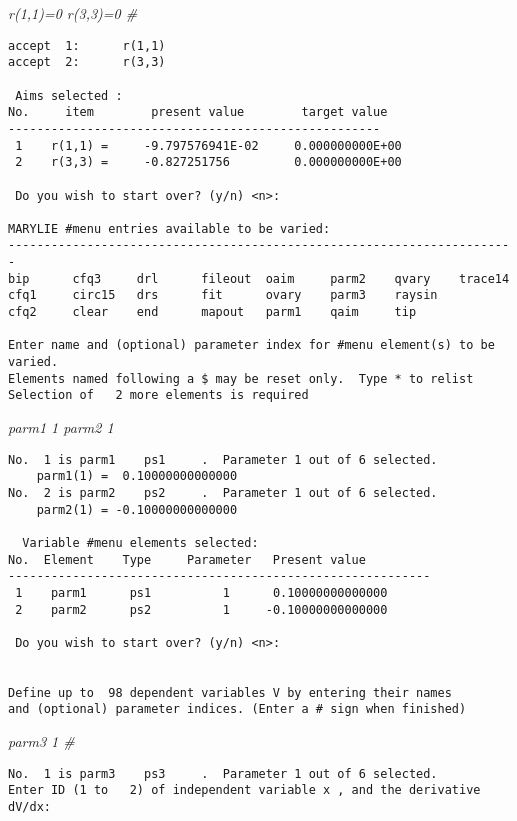 {\em r(1,1)=0 r(3,3)=0 \#}

\begin{footnotesize}
\begin{verbatim}
accept  1:      r(1,1)
accept  2:      r(3,3)

 Aims selected :
No.     item        present value        target value
----------------------------------------------------
 1    r(1,1) =     -9.797576941E-02     0.000000000E+00
 2    r(3,3) =     -0.827251756         0.000000000E+00

 Do you wish to start over? (y/n) <n>:

MARYLIE #menu entries available to be varied:
-----------------------------------------------------------------------
bip      cfq3     drl      fileout  oaim     parm2    qvary    trace14
cfq1     circ15   drs      fit      ovary    parm3    raysin
cfq2     clear    end      mapout   parm1    qaim     tip

Enter name and (optional) parameter index for #menu element(s) to be varied.
Elements named following a $ may be reset only.  Type * to relist
Selection of   2 more elements is required
\end{verbatim}
\end{footnotesize}

{\em parm1 1 parm2 1}

\begin{footnotesize}
\begin{verbatim}
No.  1 is parm1    ps1     .  Parameter 1 out of 6 selected.
    parm1(1) =  0.10000000000000
No.  2 is parm2    ps2     .  Parameter 1 out of 6 selected.
    parm2(1) = -0.10000000000000

  Variable #menu elements selected:
No.  Element    Type     Parameter   Present value
-----------------------------------------------------------
 1    parm1      ps1          1      0.10000000000000
 2    parm2      ps2          1     -0.10000000000000

 Do you wish to start over? (y/n) <n>:


Define up to  98 dependent variables V by entering their names
and (optional) parameter indices. (Enter a # sign when finished)
\end{verbatim}
\end{footnotesize}

{\em parm3 1 \#}

\begin{footnotesize}
\begin{verbatim}
No.  1 is parm3    ps3     .  Parameter 1 out of 6 selected.
Enter ID (1 to   2) of independent variable x , and the derivative dV/dx:
\end{verbatim}
\end{footnotesize}

